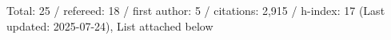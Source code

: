 Total: 25 / refereed: 18 / first author: 5 / citations: 2,915 / h-index: 17 (Last updated: 2025-07-24), List attached below